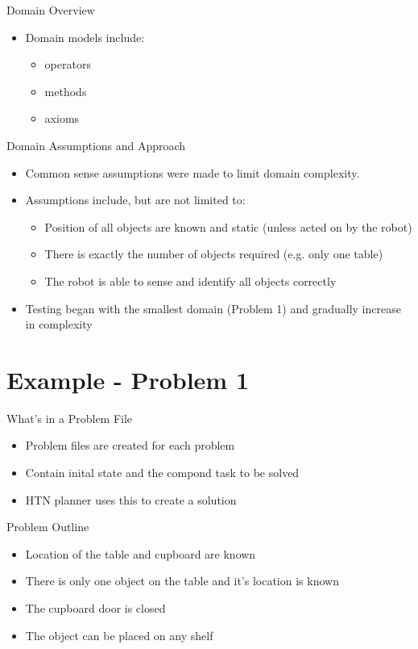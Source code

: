 \documentclass{beamer}
\begin{document}
\begin{frame}{Domain Overview}
  \begin{itemize}
    \item Domain models include:
      \begin{itemize}
        \item operators
        \item methods
        \item axioms
      \end{itemize}
  \end{itemize}
\end{frame}

\begin{frame}{Domain Assumptions and Approach}
  \begin{itemize}
    \item Common sense assumptions were made to limit domain complexity.
    \item Assumptions include, but are not limited to:
      \begin{itemize}
        \item Position of all objects are known and static (unless acted on by the robot)
        \item There is exactly the number of objects required (e.g. only one table)
        \item The robot is able to sense and identify all objects correctly
      \end{itemize}
    \item Testing began with the smallest domain (Problem 1) and gradually increase in complexity
  \end{itemize}
\end{frame}


\section{Example - Problem 1}
\begin{frame}{What's in a Problem File}
  \begin{itemize}
    \item Problem files are created for each problem
    \item Contain inital state and the compond task to be solved
    \item HTN planner uses this to create a solution
  \end{itemize}
\end{frame}

\begin{frame}{Problem Outline}
  \begin{itemize}
    \item Location of the table and cupboard are known
    \item There is only one object on the table and it's location is known
    \item The cupboard door is closed
    \item The object can be placed on any shelf
  \end{itemize}
\end{frame}
\end{document}
